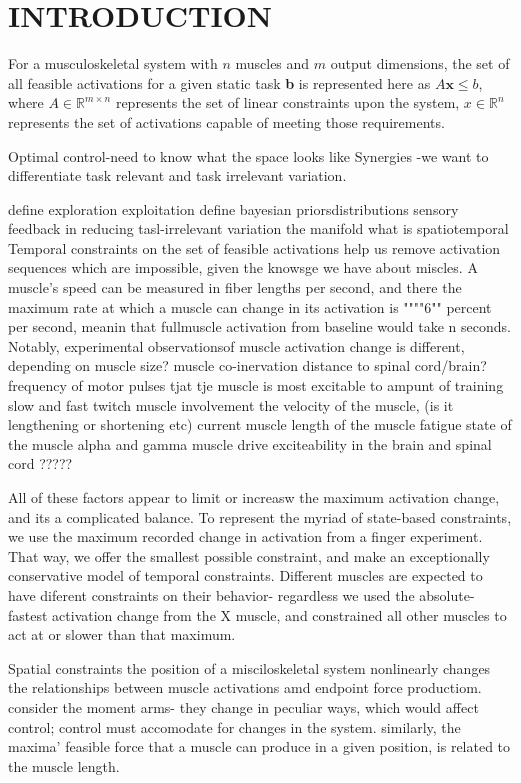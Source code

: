 
\section{INTRODUCTION}

For a musculoskeletal system with $n$ muscles and $m$ output dimensions, the set of all feasible activations for a given static task \textbf{b} is represented here as
$A\textbf{x} \leq b$, where $A \in \mathbb{R}^{m \times n}$ represents the set of linear constraints upon the system, $x \in \mathbb{R}^n$ represents the set of activations capable of meeting those requirements.

Optimal control-need to know what the space looks like
Synergies -we want to differentiate task relevant and task irrelevant variation.




define exploration exploitation
define bayesian priors\posterior distributions
sensory feedback in reducing tasl-irrelevant variation
the manifold
what is spatiotemporal
Temporal constraints on the set of feasible activations help us remove activation sequences which are impossible, given the knowsge we have about miscles.
A muscle's speed can be measured in fiber lengths per second, and there the maximum rate at which a muscle can change in its activation is """"6"" percent per second, meanin that fullmuscle activation from baseline would take n seconds.
Notably, experimental observationsof muscle activation change is different, depending on
muscle size?
muscle co-inervation
distance to spinal cord/brain?
frequency of motor pulses tjat tje muscle is most excitable to
ampunt of training
slow and fast twitch muscle involvement
the velocity of the muscle, (is it lengthening or shortening etc)
current muscle length of the muscle
fatigue state of the muscle
alpha and gamma muscle drive
exciteability in the brain and spinal cord
?????

All of these factors appear to limit or increasw the maximum activation change, and its a complicated balance. To represent the myriad of state-based constraints, we use the maximum recorded change in activation from a finger experiment.
That way, we offer the smallest possible constraint, and make an exceptionally conservative model of temporal constraints.
Different muscles are expected to have diferent constraints on their behavior- regardless we used the absolute-fastest activation change from the X muscle, and constrained all other muscles to act at or slower than that maximum.

Spatial constraints
the position of a misciloskeletal system nonlinearly changes the relationships between muscle activations amd endpoint  force productiom.
consider the moment arms- they change in peculiar ways, which would affect control; control must accomodate for changes in the system.
similarly, the maxima' feasible force that a muscle can produce in a given position, is related to the muscle length.




